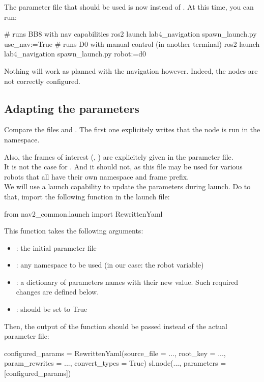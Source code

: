 \documentclass{ecnreport}
\begin{document}
The parameter file that should be used is now  instead of . At this time, you can run:
\begin{bashcodelarge}
# runs BB8 with nav capabilities
ros2 launch lab4_navigation spawn_launch.py use_nav:=True
# runs D0 with manual control (in another terminal)
ros2 launch lab4_navigation spawn_launch.py robot:=d0
 \end{bashcodelarge}
 Nothing will work as planned with the navigation however. Indeed, the nodes are not correctly configured.

\subsection{Adapting the parameters}

Compare the files  and . The first one explicitely writes that the node is run in the  namespace. 

Also, the frames of interest (, ) are explicitely given in the parameter file.\\

It is not the case for . And it should not, as this file may be used for various robots that all have their own namespace and frame prefix.\\
We will use a launch capability to update the parameters during launch. Do to that, import the following function in the launch file:
\begin{pythoncodelarge}
from nav2_common.launch import RewrittenYaml
\end{pythoncodelarge}

This function takes the following arguments:
\begin{itemize}
\item {}: the initial parameter file
\item {}: any namespace to be used (in our case: the robot variable)
\item {}: a dictionary of parameters names with their new value. Such required changes are defined below.
\item {}: should be set to True
\end{itemize}

Then, the output of the function should be passed instead of the actual parameter file:
\begin{pythoncodelarge}
configured_params = RewrittenYaml(source_file = ...,
                                    root_key = ..., 
                                    param_rewrites = ...,
                                    convert_types = True)
sl.node(..., parameters = [configured_params])
\end{pythoncodelarge}
\end{document}
